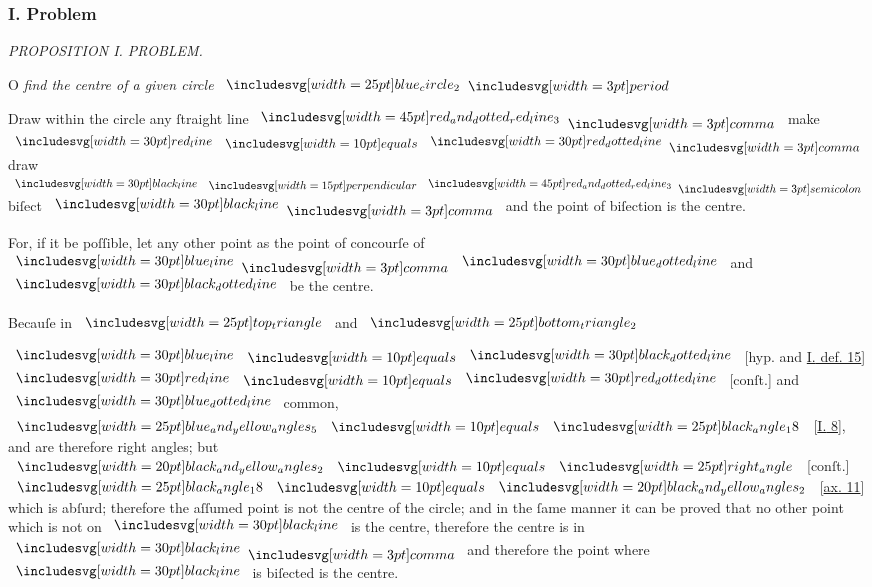 \documentclass[12pt,preview]{standalone}
\begin{document}
\subsubsection{I. Problem}

\begin{minipage}[t]{0.64\textwidth}
    \vspace{0pt}

    \begin{center}
        \textit{PROPOSITION I. PROBLEM.}\label{book3pr1} \\
    \end{center}

    \hfill

    \begin{center}
        \raggedright \lettrine[lines=4, loversize=1, nindent=0pt]{}{}O \textit{find the centre of a given circle} $\img{blue_circle_2} \bperiod$
    \end{center}

    \hfill

    \hfill

    \hfill

    \hfill

    {\vspace{1ex}\begin{center}
            Draw within the circle any ſtraight line $\bimg{red_and_dotted_red_line_3} \bcomma$ make $\redline \bequals \dottedredline \bcomma$ draw $\blackline \bperp \bimg{red_and_dotted_red_line_3} \bsemicolon$ biſect $\blackline \bcomma$ and the point of biſection is the centre.
        \end{center}}

    \hfill

    \begin{center}
        For, if it be poſſible, let any other point as the point of concourſe of $\blueline \bcomma \dottedblueline$ and $\dottedblackline$ be the centre.
    \end{center}

    \hfill

    \begin{center}
        Becauſe in $\img{top_triangle}$ and $\img{bottom_triangle_2}$\\
    \end{center}

    \hfill

    \raggedright $\blueline \bequals \dottedblackline$ [hyp. and \hyperref[book1def15]{\textsc{I.} def. 15}] $\redline \bequals \dottedredline$ [conſt.] and $\dottedblueline$ common, $\img{blue_and_yellow_angles_5} \bequals \img{black_angle_18}$ [\hyperref[book1pr8]{\textsc{I.} 8}], and are therefore right angles; but $\img[0][0][20]{black_and_yellow_angles_2} \bequals \img{right_angle}$ [conſt.] $\img{black_angle_18} \bequals \img[0][0][20]{black_and_yellow_angles_2}$ [\hyperref[ax11]{ax. 11}] which is abſurd; therefore the aſſumed point is not the centre of the circle;
    and in the ſame manner it can be proved that no other point which is not on $\blackline$ is the centre, therefore the centre is in $\blackline \bcomma$ and therefore the point where $\blackline$ is biſected is the centre.


\end{minipage}
\end{document}
